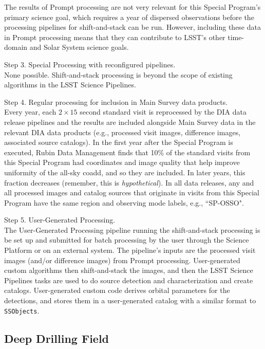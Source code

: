 The results of Prompt processing are not very relevant for this Special Program's primary science goal,
which requires a year of dispersed observations before the processing pipelines for shift-and-stack can be run.
However, including these data in Prompt processing means that
they can contribute to LSST's other time-domain and Solar System science goals.

Step 3. Special Processing with reconfigured pipelines. \\
None possible. 
Shift-and-stack processing is beyond the scope of existing algorithms in the LSST Science Pipelines.

Step 4. Regular processing for inclusion in Main Survey data products. \\
Every year, each $2\times15$ second standard visit is reprocessed by the DIA data release pipelines
and the results are included alongside Main Survey data in the relevant DIA data products
(e.g., processed visit images, difference images, associated source catalogs).
In the first year after the Special Program is executed,
Rubin Data Management finds that 10\% of the standard visits from this Special Program
had coordinates and image quality that help improve uniformity of the all-sky coadd,
and so they are included.
In later years, this fraction decreases (remember, this is \emph{hypothetical}).
In all data releases, any and all processed images and catalog sources that originate in visits from this Special Program
have the same region and observing mode labels, e.g., ``SP-OSSO".

Step 5. User-Generated Processing. \\
The User-Generated Processing pipeline running the shift-and-stack processing is be set up and submitted 
for batch processing by the user through the Science Platform or on an external system. 
The pipeline's inputs are the processed visit images (and/or difference images) from Prompt processing.
User-generated custom algorithms then shift-and-stack the images, and then the LSST Science Pipelines
tasks are used to do source detection and characterization and create catalogs.
User-generated custom code derives orbital parameters for the detections, and stores
them in a user-generated catalog with a similar format to {\tt SSObjects}.


\subsection{Deep Drilling Field}\label{ssec:SPCS_SNDDF}

